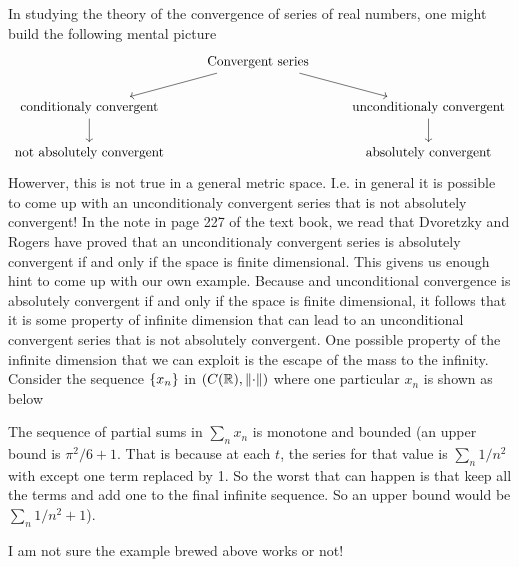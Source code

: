 \begin{summary}
	In studying the theory of the convergence of series of real numbers, one might build the following mental picture
	\[\begin{tikzcd}
		& {\text{Convergent series}} \\
		{\text{conditionaly convergent}} && {\text{unconditionaly convergent}} \\
		{\text{not absolutely convergent}} && {\text{absolutely convergent}}
		\arrow[from=1-2, to=2-1]
		\arrow[from=1-2, to=2-3]
		\arrow[from=2-1, to=3-1]
		\arrow[from=2-3, to=3-3]
	\end{tikzcd}\]
	Howerver, this is not true in a general metric space. I.e. in general it is possible to come up with an unconditionaly convergent series that is not absolutely convergent! In the note in page 227 of the text book, we read that Dvoretzky and Rogers have proved that an unconditionaly convergent series is absolutely convergent if and only if the space is finite dimensional. This givens us enough hint to come up with our own example. Because and unconditional convergence is absolutely convergent if and only if the space is finite dimensional, it follows that it is some property of infinite dimension that can lead to an unconditional convergent series that is not absolutely convergent. One possible property of the infinite dimension that we can exploit is the escape of the mass to the infinity. Consider the sequence $ \{x_n\} $ in $(C(\mathbb{R}),\norm{\cdot}) $ where one particular $ x_n $ is shown as below
	
	The sequence of partial sums in $ \sum_n x_n $ is monotone and bounded (an upper bound is $ \pi^2/6 + 1 $. That is because at each $ t $, the series for that value is $ \sum_n 1/n^2 $ with except one term replaced by 1. So the worst that can happen is that keep all the terms and add one to the final infinite sequence. So an upper bound would be $ \sum_n 1/n^2 + 1 $). 
\end{summary}
\begin{remark}
	I am not sure the example brewed above works or not!
\end{remark}

\newpage


